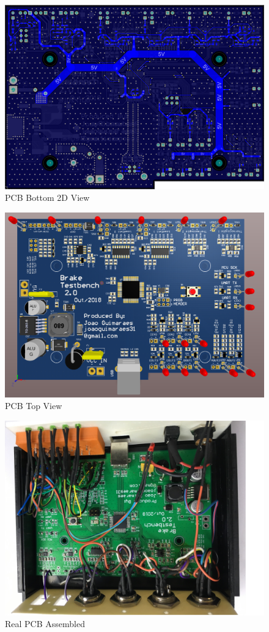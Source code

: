 		\begin{figure}[htbp]
			\centering
			\includegraphics[width=.8\textwidth]{figuras/fig-pcb-design-bottom}
			\caption{PCB Bottom 2D View}
			\label{fig:pcb-design-bottom}
		\end{figure}

		\begin{figure}[htbp]
			\centering
			\includegraphics[width=.8\textwidth]{figuras/fig-pcb-print-top}
			\caption{PCB Top View}
			\label{fig:pcb-print-top}
		\end{figure}

		\begin{figure}[htbp]
			\centering
			\includegraphics[width=.8\textwidth]{figuras/fig-pcb-real}
			\caption{Real PCB Assembled}
			\label{fig-pcb-real}
		\end{figure}